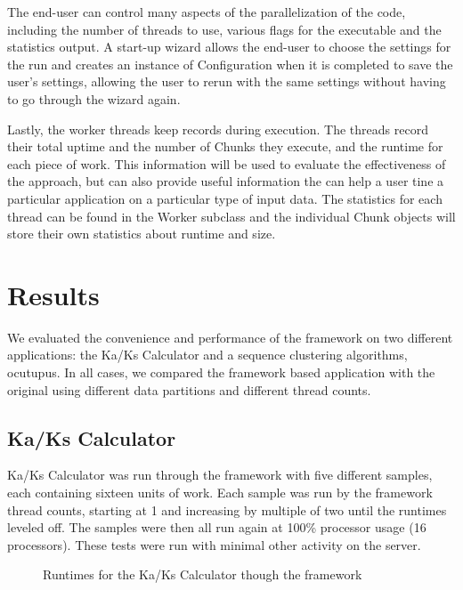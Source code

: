 \documentclass[12pt]{article}
\begin{document}
The end-user can control many aspects of the parallelization of the code,
including the number of threads to use, various flags for the executable and the
statistics output.  A start-up wizard allows the end-user to choose the settings
for the run and creates an instance of Configuration when it is completed to
save the user's settings, allowing the user to rerun with the same settings
without having to go through the wizard again.

Lastly, the worker threads keep records during execution. The threads record
their total uptime and the number of Chunks they execute, and the runtime for
each piece of work. This information will be used to evaluate the effectiveness
of the approach, but can also provide useful information the can help a user
tine a particular application on a particular type of input data. The statistics
for each thread can be found in the Worker subclass and the individual Chunk
objects will store their own statistics about runtime and size.

\section{Results}

We evaluated the convenience and performance of the framework on two different
applications: the Ka/Ks Calculator and a sequence clustering algorithms,
ocutupus. In all cases, we compared the framework based application with the
original using different data partitions and different thread counts.

\subsection{Ka/Ks Calculator}
Ka/Ks Calculator was run through the framework with five different samples, each
containing sixteen units of work. Each sample was run by the framework thread
counts, starting at 1 and increasing by multiple of two until the runtimes
leveled off. The samples were then all run again at 100\% processor usage (16
processors). These tests were run with minimal other activity on the server.

\begin{figure}
    \begin{center}
    \end{center}
    \caption{Runtimes for the Ka/Ks Calculator though the framework}
    \label{fig:time}
\end{figure}
\end{document}
